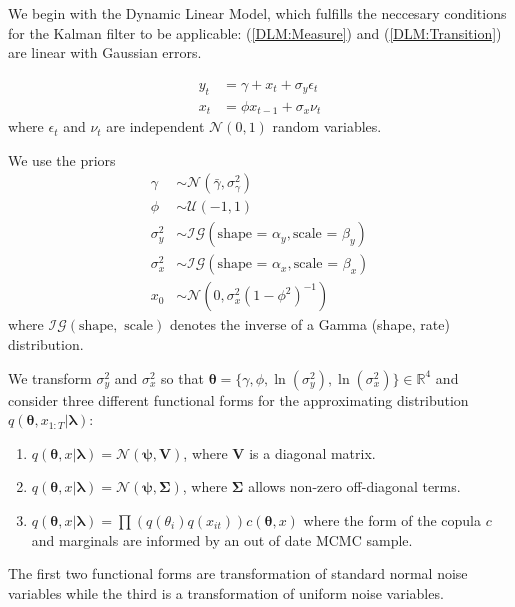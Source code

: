 \documentclass[12pt,a4paper]{article}%
\numberwithin{equation}{section}
\begin{document}
We begin with the Dynamic Linear Model, which fulfills the neccesary conditions for the Kalman filter to be applicable: (\ref{DLM:Measure}) and (\ref{DLM:Transition}) are linear with Gaussian errors.

\begin{align}
y_t &= \gamma + x_t + \sigma_y \epsilon_t \label{DLM:Measure}\\
x_t &= \phi x_{t-1} + \sigma_x \nu_t \label{DLM:Transition}
\end{align}
where $\epsilon_t$ and $\nu_t$ are independent $\mathcal{N}(0, 1)$ random variables.

We use the priors
\begin{align}
\gamma &\sim \mathcal{N}(\bar{\gamma}, \sigma^2_{\gamma}) \\
\phi &\sim \mathcal{U}(-1, 1) \\
\sigma^2_y &\sim \mathcal{IG}(\mbox{shape = }\alpha_y, \mbox{scale = }\beta_y) \\
\sigma^2_x &\sim \mathcal{IG}(\mbox{shape = }\alpha_x, \mbox{scale = }\beta_x) \\
x_0 &\sim \mathcal{N}(0, \sigma^2_x(1 - \phi^2)^{-1})
\end{align}
where $\mathcal{IG}(\mbox{shape}, \mbox{ scale})$ denotes the inverse of a Gamma (shape, rate) distribution.

We transform $\sigma^2_y$ and $\sigma^2_x$ so that $\boldsymbol{\theta} = \{\gamma, \phi, \ln(\sigma^2_y), \ln(\sigma^2_x) \} \in \mathbb{R}^4$ and consider three different functional forms for the approximating distribution $q(\boldsymbol{\theta}, x_{1:T} | \boldsymbol{\lambda})$:
\begin{enumerate}
\item $q(\boldsymbol{\theta}, x | \boldsymbol{\lambda}) = \mathcal{N}(\boldsymbol{\psi}, \textbf{V})$, where $\textbf{V}$ is a diagonal matrix.
\item $q(\boldsymbol{\theta}, x | \boldsymbol{\lambda}) = \mathcal{N}(\boldsymbol{\psi}, \boldsymbol{\Sigma})$, where $\boldsymbol{\Sigma}$ allows non-zero off-diagonal terms.
\item  $q(\boldsymbol{\theta}, x | \boldsymbol{\lambda}) = \prod \left(q(\theta_i) q(x_{it})\right) c(\boldsymbol{\theta}, x)$ where the form of the copula $c$ and marginals are informed by an out of date MCMC sample.
\end{enumerate}
The first two functional forms are transformation of standard normal noise variables while the third is a transformation of uniform noise variables.
\end{document}
